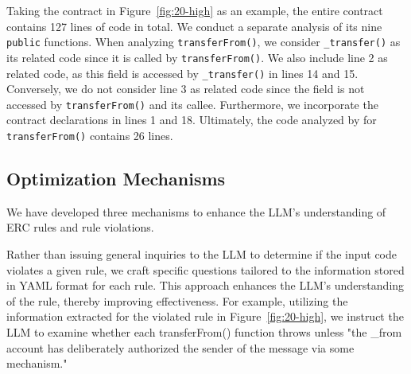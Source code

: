 Taking the contract in Figure~\ref{fig:20-high} as an example, 
the entire contract contains 127 lines of code in total. 
We conduct a separate analysis of its nine \texttt{public} functions. 
When analyzing \texttt{transferFrom()}, we consider \texttt{\_transfer()} 
as its related code since it is called by \texttt{transferFrom()}. 
We also include line 2 as related code, 
as this field is accessed by \texttt{\_transfer()} in lines 14 and 15. 
Conversely, we do not consider line 3 as related code since the field is 
not accessed by \texttt{transferFrom()} and its callee. 
Furthermore, we incorporate the contract declarations in lines 1 and 18. 
Ultimately, the code analyzed by \Tool{} for \texttt{transferFrom()} 
contains 26 lines.




\subsection{Optimization Mechanisms}

We have developed three mechanisms to enhance the LLM's understanding of ERC rules and rule violations. 





Rather than issuing general inquiries to the LLM to determine if the input code violates a 
given rule, we craft specific questions 
tailored to the information stored in YAML format for each rule. 
This approach enhances the LLM's understanding of the rule, 
thereby improving effectiveness. For example, utilizing the information extracted for the violated rule in Figure~\ref{fig:20-high}, 
we instruct the LLM to examine whether each transferFrom() function 
throws unless "the \_from account has deliberately authorized the sender of the message via some mechanism."



